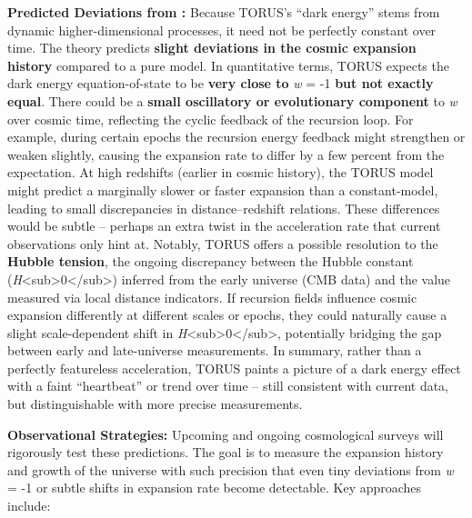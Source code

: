 \documentclass[
]{article}
\begin{document}
\textbf{Predicted Deviations from \LambdaCDM:} Because TORUS's ``dark energy''
stems from dynamic higher-dimensional processes, it need not be
perfectly constant over time. The theory predicts \textbf{slight
deviations in the cosmic expansion history} compared to a pure \LambdaCDM
model. In quantitative terms, TORUS expects the dark energy
equation-of-state to be \textbf{very close to} \emph{w} = -1 \textbf{but
not exactly equal}\hspace{0pt}. There could be a \textbf{small
oscillatory or evolutionary component} to \emph{w} over cosmic time,
reflecting the cyclic feedback of the recursion loop\hspace{0pt}. For
example, during certain epochs the recursion energy feedback might
strengthen or weaken slightly, causing the expansion rate to differ by a
few percent from the \LambdaCDM expectation. At high redshifts (earlier in
cosmic history), the TORUS model might predict a marginally slower or
faster expansion than a constant-\Lambda model, leading to small discrepancies
in distance--redshift relations\hspace{0pt}. These differences would be
subtle -- perhaps an extra twist in the acceleration rate that current
observations only hint at. Notably, TORUS offers a possible resolution
to the \textbf{Hubble tension}\hspace{0pt}, the ongoing discrepancy
between the Hubble constant
(\emph{H}\textless sub\textgreater0\textless/sub\textgreater) inferred
from the early universe (CMB data) and the value measured via local
distance indicators. If recursion fields influence cosmic expansion
differently at different scales or epochs, they could naturally cause a
slight scale-dependent shift in
\emph{H}\textless sub\textgreater0\textless/sub\textgreater\hspace{0pt},
potentially bridging the gap between early and late-universe
measurements. In summary, rather than a perfectly featureless
acceleration, TORUS paints a picture of a dark energy effect with a
faint ``heartbeat'' or trend over time -- still consistent with current
data, but distinguishable with more precise measurements.

\textbf{Observational Strategies:} Upcoming and ongoing cosmological
surveys will rigorously test these predictions. The goal is to measure
the expansion history and growth of the universe with such precision
that even tiny deviations from \emph{w} = -1 or subtle shifts in
expansion rate become detectable. Key approaches include:
\end{document}
